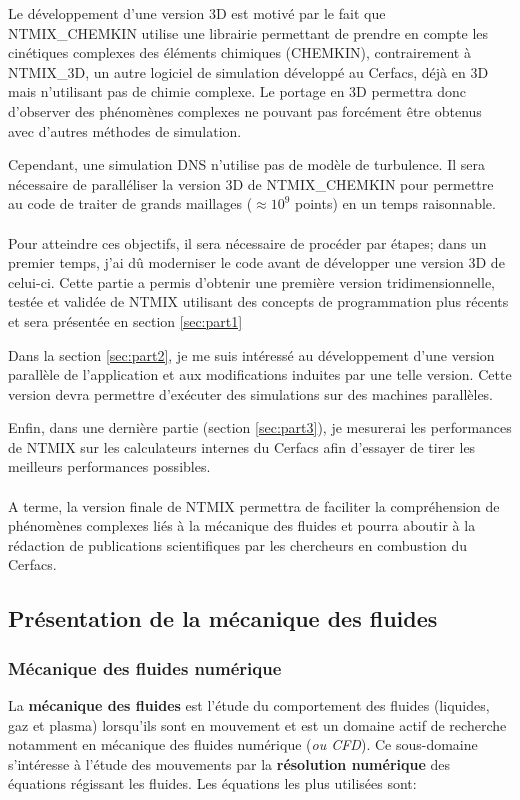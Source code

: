 Le développement d'une version 3D est motivé par le fait que NTMIX\_CHEMKIN utilise une librairie permettant de prendre en compte les cinétiques complexes des éléments chimiques (CHEMKIN), contrairement à NTMIX\_3D, un autre logiciel de simulation développé au Cerfacs, déjà en 3D mais n'utilisant pas de chimie complexe. Le portage en 3D permettra donc d'observer des phénomènes complexes ne pouvant pas forcément être obtenus avec d'autres méthodes de simulation.


Cependant, une simulation DNS n'utilise pas de modèle de turbulence. Il sera nécessaire de paralléliser la version 3D de NTMIX\_CHEMKIN pour permettre au code de traiter de grands maillages ($\approx 10^9$ points) en un temps raisonnable.


\paragraph{}Pour atteindre ces objectifs, il sera nécessaire de procéder par étapes; dans un premier temps, j'ai dû moderniser le code avant de développer une version 3D de celui-ci. Cette partie a permis d'obtenir une première version tridimensionnelle, testée et validée de NTMIX utilisant des concepts de programmation plus récents et sera présentée en section \ref{sec:part1}

Dans la section \ref{sec:part2}, je me suis intéressé au développement d'une version parallèle de l'application et aux modifications induites par une telle version. Cette version devra permettre d'exécuter des simulations sur des machines parallèles.

Enfin, dans une dernière partie (section \ref{sec:part3}), je mesurerai les performances de NTMIX sur les calculateurs internes du Cerfacs afin d'essayer de tirer les meilleurs performances possibles.

\paragraph{}A terme, la version finale de NTMIX permettra de faciliter la compréhension de phénomènes complexes liés à la mécanique des fluides et pourra aboutir à la rédaction de publications scientifiques par les chercheurs en combustion du Cerfacs.

\subsection{Présentation de la mécanique des fluides}
\subsubsection{Mécanique des fluides numérique}
La \textbf{mécanique des fluides} est l'étude du comportement des fluides (liquides, gaz et plasma) lorsqu'ils sont en mouvement et est un domaine actif de recherche notamment en mécanique des fluides numérique (\textit{ou CFD}). Ce sous-domaine s'intéresse à l'étude des mouvements par la \textbf{résolution numérique} des équations régissant les fluides. Les équations les plus utilisées sont:


